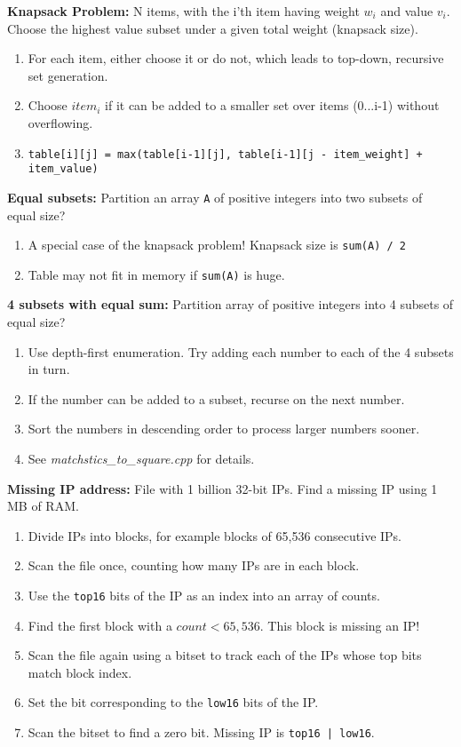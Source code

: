 \documentclass[12pt]{article}
\begin{document}
\vspace{5mm}
\noindent
\textbf{Knapsack Problem:}
N items, with the i'th item having weight $w_i$ and value $v_i$. Choose the highest value
subset under a given total weight (knapsack size).
\begin{enumerate}
\item For each item, either choose it or do not, which leads to top-down, recursive set generation.
\item Choose $item_i$ if it can be added to a smaller set over items (0...i-1) without overflowing. 
\item \texttt{table[i][j] = max(table[i-1][j], table[i-1][j - item\_weight] + item\_value)}
\end{enumerate}


\vspace{5mm}
\noindent
\textbf{Equal subsets:}
Partition an array \texttt{A} of positive integers into two subsets of equal size?
\begin{enumerate}
\item A special case of the knapsack problem! Knapsack size is \texttt{sum(A) / 2}
\item Table may not fit in memory if \texttt{sum(A)} is huge.
\end{enumerate}


\vspace{5mm}
\noindent
\textbf{4 subsets with equal sum:}
Partition array of positive integers into 4 subsets of equal size?
\begin{enumerate}
\item Use depth-first enumeration. Try adding each number to each of the 4 subsets in turn.
\item If the number can be added to a subset, recurse on the next number.
\item Sort the numbers in descending order to process larger numbers sooner.
\item See \emph{matchstics\_to\_square.cpp} for details. 
\end{enumerate}


\vspace{5mm}
\noindent
\textbf{Missing IP address:}
File with 1 billion 32-bit IPs. Find a missing IP using 1 MB of RAM.
\begin{enumerate}
\item Divide IPs into blocks, for example blocks of 65,536 consecutive IPs.
\item Scan the file once, counting how many IPs are in each block. 
\item Use the \texttt{top16} bits of the IP as an index into an array of counts.
\item Find the first block with a $count < 65,536$. This block is missing an IP!
\item Scan the file again using a bitset to track each of the IPs whose top bits match block index.
\item Set the bit corresponding to the \texttt{low16} bits of the IP.
\item Scan the bitset to find a zero bit. Missing IP is \texttt{top16 | low16}.
\end{enumerate}
\end{document}
